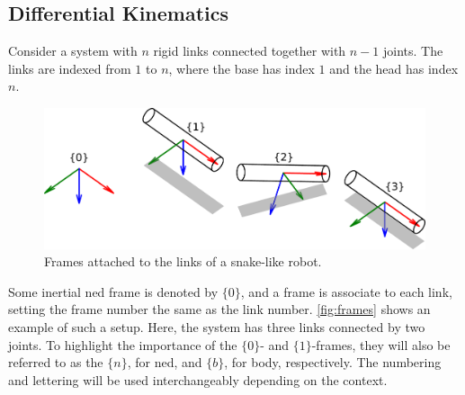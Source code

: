 \subsection{Differential Kinematics}
\label{sec:diff_kin}


Consider a system with $n$ rigid links connected together with $n-1$ joints. The
links are indexed from $1$ to $n$, where the base
has index $1$ and the head has index $n$.
\begin{figure}[h!]
    \centering
    \includegraphics[width=\textwidth]{assets/frames_thin.pdf}
    \caption{Frames attached to the links of a snake-like robot.}
    \label{fig:frames}
\end{figure}
Some inertial \gls{ned} frame is denoted by $\{0\}$, and a frame is associate to each link,
setting the frame number the same as the link number.
\autoref{fig:frames} shows an example of such a setup. Here, the system has
three links connected by two joints. To highlight the importance of the $\{0\}$-
and $\{1\}$-frames, they will also be referred to as the $\{n\}$, for \gls{ned}, and
$\{b\}$, for body, respectively. The numbering and lettering will be used interchangeably
depending on the context.

